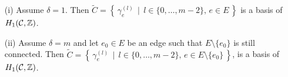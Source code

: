 \documentclass[main.tex]{subfiles}
\begin{document}
  \begin{coro}\label{coro:homo_basis}
    \begin{itemize}
     \item[(i)] Assume $\delta = 1$. Then $\tilde{C} = \left\{ \, \gamma_{e}^{(l)} \, \mid \, l \in \{ 0,\dots,m-2\} , \, e \in E \, \right\}$ is a basis of $H_1(\mathcal{C},\mathbb{Z})$.
     \item[(ii)] Assume $\delta = m$ and let $e_0 \in E$ be an edge such that $E\setminus \{ e_0 \}$ is still connected.
     Then $\tilde{C} = \left\{ \, \gamma_{e}^{(l)} \, \mid \, l \in \{ 0,\dots,m-2\} , \, e \in E\setminus \{e_0\} \, \right\}$, is a basis of $H_1(\mathcal{C},\mathbb{Z})$.
    \end{itemize}

  \end{coro}

  








\biblio 
\end{document}
